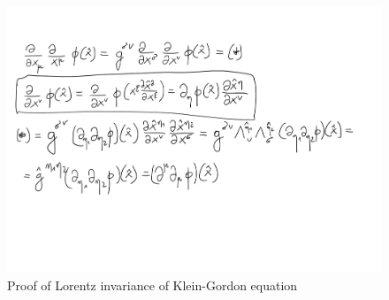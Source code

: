 \documentclass[main.tex]{subfiles}
\begin{document}
\begin{figure}[H]
\label{klein-proof}
\includegraphics[scale=0.5]{figs/KleinInvariance}
\caption{Proof of Lorentz invariance of Klein-Gordon equation}
\end{figure}
\end{document}
